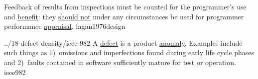 \documentclass{article}
\begin{document}

  {Feedback of results from inspections must be counted for the programmer's use and \ul{benefit}: they \ul{should not} under any circumstances be used for programmer performance \ul{appraisal}.}
  {fagan1976design}



\lnQuote
  {../18-defect-density/ieee-982}
  {A \ul{defect} is a product \ul{anomaly}. Examples include such things as 1)~omissions and imperfections found during early life cycle phases and 2)~faults contained in software sufficiently mature for test or operation.}
  {ieee982}
\end{document}
